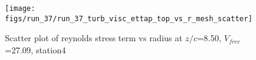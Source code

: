 \begin{figure}[H]
\centering
\texttt{[image: figs/run\_37/run\_37\_turb\_visc\_ettap\_top\_vs\_r\_mesh\_scatter]}
\caption{Scatter plot of reynolds stress term vs radius at $z/c$=8.50, $V_{free}$=27.09, station4}
\label{fig:run_37_turb_visc_ettap_top_vs_r_mesh_scatter}
\end{figure}



